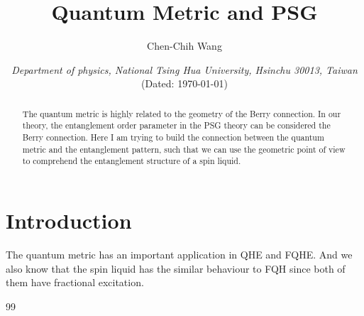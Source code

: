 \documentclass[12font]{article}
\title{\textbf{ Quantum Metric and PSG }}
\author{Chen-Chih Wang  }
\date{\textit{Department of physics, National Tsing Hua University, Hsinchu 30013, Taiwan} \\ (Dated: \today)}
\begin{document}
\maketitle



\begin{abstract}
  The quantum metric is highly related to the geometry of the Berry connection. In our theory, the entanglement order parameter in the PSG theory can be considered the Berry connection. Here I am trying to build the connection between the quantum metric and the entanglement pattern, such that we can use the geometric point of view to comprehend the entanglement structure of a spin liquid. 
\end{abstract}

\section{Introduction}
The quantum metric has an important application in QHE and FQHE. And we also know that the spin liquid has the similar behaviour to FQH since both of them have fractional excitation. 



\begin{thebibliography}{99}

    \bibitem{}{}

\end{thebibliography}
\end{document}
